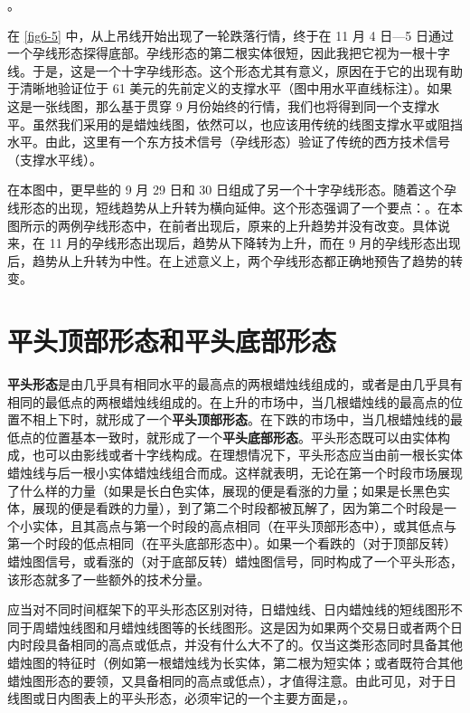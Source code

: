。

在 \autoref{fig6-5} 中，从上吊线开始出现了一轮跌落行情，终于在 11 月 4 日—5 日通过一个孕线形态探得底部。孕线形态的第二根实体很短，因此我把它视为一根十字线。于是，这是一个十字孕线形态。这个形态尤其有意义，原因在于它的出现有助于清晰地验证位于 61 美元的先前定义的支撑水平（图中用水平直线标注）。如果这是一张线图，那么基于贯穿 9 月份始终的行情，我们也将得到同一个支撑水平。虽然我们采用的是蜡烛线图，依然可以，也应该用传统的线图支撑水平或阻挡水平。由此，这里有一个东方技术信号（孕线形态）验证了传统的西方技术信号（支撑水平线）。

在本图中，更早些的 9 月 29 日和 30 日组成了另一个十字孕线形态。随着这个孕线形态的出现，短线趋势从上升转为横向延伸。这个形态强调了一个要点：。在本图所示的两例孕线形态中，在前者出现后，原来的上升趋势并没有改变。具体说来，在 11 月的孕线形态出现后，趋势从下降转为上升，而在 9 月的孕线形态出现后，趋势从上升转为中性。在上述意义上，两个孕线形态都正确地预告了趋势的转变。

\section{平头顶部形态和平头底部形态}
\textbf{平头形态}是由几乎具有相同水平的最高点的两根蜡烛线组成的，或者是由几乎具有相同的最低点的两根蜡烛线组成的。在上升的市场中，当几根蜡烛线的最高点的位置不相上下时，就形成了一个\textbf{平头顶部形态}。在下跌的市场中，当几根蜡烛线的最低点的位置基本一致时，就形成了一个\textbf{平头底部形态}。平头形态既可以由实体构成，也可以由影线或者十字线构成。在理想情况下，平头形态应当由前一根长实体蜡烛线与后一根小实体蜡烛线组合而成。这样就表明，无论在第一个时段市场展现了什么样的力量（如果是长白色实体，展现的便是看涨的力量；如果是长黑色实体，展现的便是看跌的力量），到了第二个时段都被瓦解了，因为第二个时段是一个小实体，且其高点与第一个时段的高点相同（在平头顶部形态中），或其低点与第一个时段的低点相同（在平头底部形态中）。如果一个看跌的（对于顶部反转）蜡烛图信号，或看涨的（对于底部反转）蜡烛图信号，同时构成了一个平头形态，该形态就多了一些额外的技术分量。

应当对不同时间框架下的平头形态区别对待，日蜡烛线、日内蜡烛线的短线图形不同于周蜡烛线图和月蜡烛线图等的长线图形。这是因为如果两个交易日或者两个日内时段具备相同的高点或低点，并没有什么大不了的。仅当这类形态同时具备其他蜡烛图的特征时（例如第一根蜡烛线为长实体，第二根为短实体；或者既符合其他蜡烛图形态的要领，又具备相同的高点或低点），才值得注意。由此可见，对于日线图或日内图表上的平头形态，必须牢记的一个主要方面是，。

